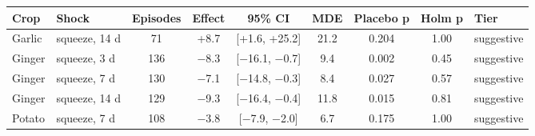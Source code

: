 \renewcommand{\arraystretch}{1.25}
\footnotesize
\begin{tabular}{|l|l|c|c|c|c|c|c|l|}
\hline
\textbf{Crop} & \textbf{Shock} & \textbf{Episodes} & \textbf{Effect} & \textbf{95\% CI} & \textbf{MDE} & \textbf{Placebo p} & \textbf{Holm p} & \textbf{Tier} \\
\hline
Garlic & squeeze, 14 d & 71 & +8.7 & [+1.6, +25.2] & 21.2 & 0.204 & 1.00 & suggestive \\
\hline
Ginger & squeeze, 3 d & 136 & $-$8.3 & [$-$16.1, $-$0.7] & 9.4 & 0.002 & 0.45 & suggestive \\
\hline
Ginger & squeeze, 7 d & 130 & $-$7.1 & [$-$14.8, $-$0.3] & 8.4 & 0.027 & 0.57 & suggestive \\
\hline
Ginger & squeeze, 14 d & 129 & $-$9.3 & [$-$16.4, $-$0.4] & 11.8 & 0.015 & 0.81 & suggestive \\
\hline
Potato & squeeze, 7 d & 108 & $-$3.8 & [$-$7.9, $-$2.0] & 6.7 & 0.175 & 1.00 & suggestive \\
\hline
\end{tabular}
